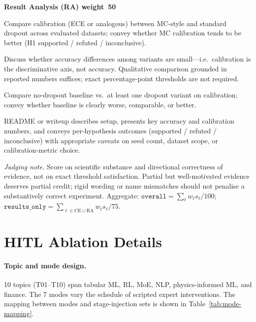 \begin{tcolorbox}
\smallskip
\textbf{Result Analysis (RA) \textemdash{} weight~50}
\begin{description}[nosep,leftmargin=1.2em,labelsep=0.4em,font=\ttfamily\small]
\item[t01-result-h1 \normalfont{[20.0]}]
Compare calibration (ECE or analogous) between MC-style and standard dropout
across evaluated datasets; convey whether MC calibration tends to be better
(H1 supported / refuted / inconclusive).
\item[t01-result-h2 \normalfont{[10.0]}]
Discuss whether accuracy differences among variants are small---i.e.\ calibration
is the discriminative axis, not accuracy. Qualitative comparison grounded in
reported numbers suffices; exact percentage-point thresholds are not required.
\item[t01-result-h3 \normalfont{[10.0]}]
Compare no-dropout baseline vs.\ at least one dropout variant on calibration;
convey whether baseline is clearly worse, comparable, or better.
\item[t01-result-writeup \normalfont{[10.0]}]
README or writeup describes setup, presents key accuracy and calibration numbers,
and conveys per-hypothesis outcomes (supported / refuted / inconclusive) with
appropriate caveats on seed count, dataset scope, or calibration-metric choice.
\end{description}

\smallskip
\textit{Judging note.} Score on scientific substance and directional correctness
of evidence, not on exact threshold satisfaction. Partial but well-motivated
evidence deserves partial credit; rigid wording or name mismatches should not
penalise a substantively correct experiment. Aggregate:
$\texttt{overall} = \textstyle\sum_\ell w_\ell s_\ell / 100$;
$\texttt{results\_only} = \textstyle\sum_{\ell \in \mathrm{CE}\cup\mathrm{RA}}
w_\ell s_\ell / 75$.
\end{tcolorbox}

\section{HITL Ablation Details}
\label{app:hitl-setup}

\paragraph{Topic and mode design.} 10 topics (T01--T10) span tabular ML, RL, MoE, NLP, physics-informed ML, and finance. The 7 modes vary the schedule of scripted expert interventions. The mapping between modes and stage-injection sets is shown in Table~\ref{tab:mode-mapping}.

